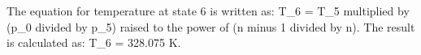 The equation for temperature at state 6 is written as:  
T_6 = T_5 multiplied by (p_0 divided by p_5) raised to the power of (n minus 1 divided by n).  
The result is calculated as:  
T_6 = 328.075 K.